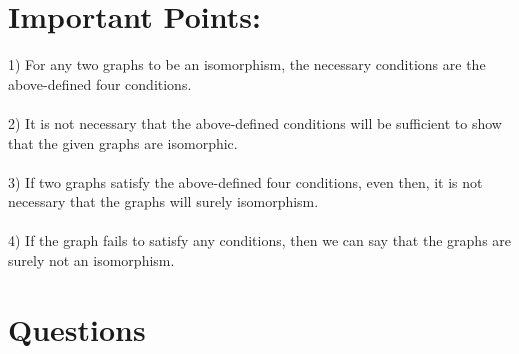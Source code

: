 \documentclass{exam}
\begin{document}
\section{Important Points:}
1) For any two graphs to be an isomorphism, the necessary conditions are the above-defined four conditions.\\
\\
2) It is not necessary that the above-defined conditions will be sufficient to show that the given graphs are isomorphic.\\
\\
3) If two graphs satisfy the above-defined four conditions, even then, it is not necessary that the graphs will surely isomorphism.\\
\\
4) If the graph fails to satisfy any conditions, then we can say that the graphs are surely not an isomorphism.\\

\vspace{5mm}

\section{Questions}
\end{document}
